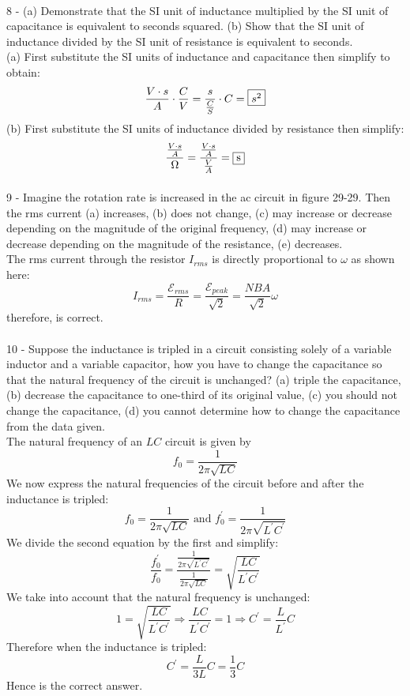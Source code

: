 \documentclass{report}
\begin{document}
\paragraph{}
8 - (a) Demonstrate that the SI unit of inductance multiplied by the SI unit of capacitance is equivalent to seconds squared. (b) Show that the SI unit of inductance divided by the SI unit of resistance is equivalent to seconds.\\
(a) First substitute the SI units of inductance and capacitance then simplify to obtain:
$$\frac{V \cdot s}{A} \cdot \frac{C}{V} = \frac{s}{\frac{C}{S}} \cdot C = \fbox{$s^2$}$$
(b) First substitute the SI units of inductance divided by resistance then simplify:
$$\frac{\frac{V \cdot s}{A}}{\Omega} = \frac{\frac{V \cdot s}{A}}{\frac{V}{A}} = \fbox{s}$$

\paragraph{}
9 - Imagine the rotation rate is increased in the ac circuit in figure 29-29. Then the rms current (a) increases, (b) does not change, (c) may increase or decrease depending on the magnitude of the original frequency, (d) may increase or decrease depending on the magnitude of the resistance, (e) decreases.\\
The rms current through the resistor $I_{rms}$ is directly proportional to $\omega$ as shown here:
$$I_{rms} = \frac{\mathcal{E}_{rms}}{R} = \frac{\mathcal{E}_{peak}}{\sqrt{2}} = \frac{NBA}{\sqrt{2}}\omega$$
therefore,  is correct.

\paragraph{}
10 - Suppose the inductance is tripled in a circuit consisting solely of a variable inductor and a variable capacitor, how you have to change the capacitance so that the natural frequency of the circuit is unchanged? (a) triple the capacitance, (b) decrease the capacitance to one-third of its original value, (c) you should not change the capacitance, (d) you cannot determine how to change the capacitance from the data given.\\
The natural frequency of an $LC$ circuit is given by
$$f_0 = \frac{1}{2\pi\sqrt{LC}}$$
We now express the natural frequencies of the circuit before and after the inductance is tripled:
$$f_0 = \frac{1}{2\pi\sqrt{LC}} \text{ and } f_0^\prime = \frac{1}{2\pi\sqrt{L^\prime C^\prime}}$$
We divide the second equation by the first and simplify:
$$\frac{f_0^\prime}{f_0} = \frac{\frac{1}{2\pi\sqrt{L^\prime C^\prime}}}{\frac{1}{2\pi\sqrt{LC}}} = \sqrt{\frac{LC}{L^\prime C^\prime}}$$
We take into account that the natural frequency is unchanged:
$$1 = \sqrt{\frac{LC}{L^\prime C^\prime}} \Rightarrow \frac{LC}{L^\prime C^\prime} = 1 \Rightarrow C^\prime = \frac{L}{L^\prime}C$$
Therefore when the inductance is tripled:
$$C^\prime = \frac{L}{3L}C = \frac{1}{3}C$$
Hence  is the correct answer.
\end{document}
